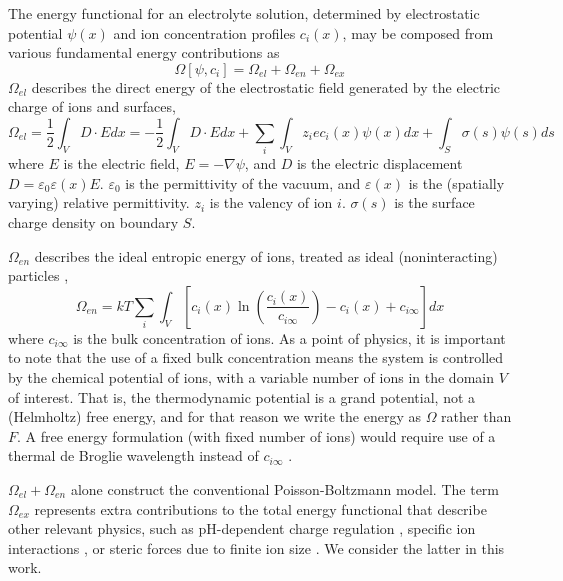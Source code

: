 The energy functional for an electrolyte solution, determined by
electrostatic potential $\psi(x)$ and ion concentration profiles
$c_i(x)$, may be composed from various fundamental energy
contributions as
\begin{equation}
    \Omega[\psi, c_i] = \Omega_{el} + \Omega_{en} +  \Omega_{ex}
\end{equation}
$\Omega_{el}$ describes the direct energy of the electrostatic field generated by the electric charge of ions and surfaces, \cite{Jackson_Classical_Electrodynamics}
\begin{equation}
  \Omega_{el}  =\frac{1}{2} \int_{V}D \cdot E dx
  = -\frac{1}{2} \int_{V}D \cdot E dx + \sum_i \int_V z_i e c_i(x) \psi(x) dx
  + \int_{S} \sigma(s) \psi(s) ds
\end{equation}
where $E$ is the electric field, $E=-\nabla\psi$, and $D$ is the
electric displacement $D=\varepsilon_0
\varepsilon(x)E$. $\varepsilon_0$ is the permittivity of the vacuum,
and $\varepsilon(x)$ is the (spatially varying) relative
permittivity. $z_i$ is the valency of ion $i$.  $\sigma(s)$ is the
surface charge density on boundary $S$.

$\Omega_{en}$ describes the ideal entropic energy of ions, treated as ideal (noninteracting) particles \cite{GrayStiles2018,DagmawiParsons2024},
\begin{equation}
    \Omega_{en} = kT \sum_{i} \int_{V} \left[ c_i(x) \ln \left(\frac{c_i(x)}{c_{i\infty}} \right) - c_{i}(x) + c_{i\infty} \right] dx 
\end{equation}
where $c_{i\infty}$ is the bulk concentration of ions. As a point of
physics, it is important to note that the use of a fixed bulk
concentration means the system is controlled by the chemical potential
of ions, with a variable number of ions in the domain $V$ of interest.
That is, the thermodynamic potential is a grand potential, not a
(Helmholtz) free energy, and for that reason we write the energy as $\Omega$ rather
than $F$. A free energy formulation (with fixed number of ions) would
require use of a thermal de Broglie wavelength instead of
$c_{i\infty}$ \cite{GrayStiles2018}.

$\Omega_{el} + \Omega_{en}$ alone construct the conventional
Poisson-Boltzmann model. The term $\Omega_{ex}$ represents extra
contributions to the total energy functional that describe other
relevant physics, such as pH-dependent charge regulation
\cite{ParsonsSalis2019}, specific ion interactions
\cite{ParsonsCarucciSalis2022}, or steric forces due to finite ion
size \cite{LopezGarciaHornoGrosse2018}. We consider the latter in this
work.

